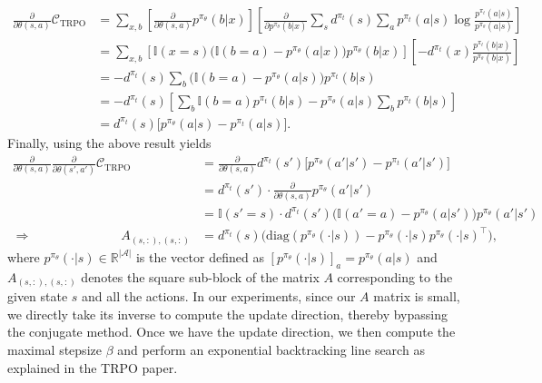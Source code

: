 \documentclass[a4paper, 10pt]{article}
\begin{document}
\begin{align}
  \frac{\partial}{\partial \theta(s, a)} \mathcal{C}_{\text{TRPO}} &= \sum_{x, b} \left[ \frac{\partial}{\partial \theta(s, a)} p^{\pi_\theta}(b | x) \right] \left[ \frac{\partial}{\partial p^{\pi_\theta}(b | x)} \sum_s d^{\pi_t}(s) \sum_a p^{\pi_t}(a | s) \log \frac{p^{\pi_t}(a | s)}{p^{\pi_\theta}(a | s)} \right] \nonumber \\
  &= \sum_{x, b} \left[ \mathbb{I}(x = s) \Big( \mathbb{I}(b = a) - p^{\pi_\theta}(a | x) \Big) p^{\pi_\theta}(b | x) \right] \left[ - d^{\pi_t}(x) \frac{p^{\pi_t}(b | x)}{p^{\pi_\theta}(b | x)} \right] \nonumber \\
  &= - d^{\pi_t}(s) \sum_b \Big( \mathbb{I}(b = a) - p^{\pi_\theta}(a | s) \Big) p^{\pi_t}(b | s) \nonumber \\
  &= - d^{\pi_t}(s) \left[ \sum_b \mathbb{I}(b = a) p^{\pi_t}(b | s) - p^{\pi_\theta}(a | s) \sum_b p^{\pi_t}(b | s) \right] \nonumber \\
  &= d^{\pi_t}(s) \Big[ p^{\pi_\theta}(a | s) - p^{\pi_t}(a | s) \Big]. \label{eq: trpo_kl_mid}
\end{align}
Finally, using the above result yields
\begin{align}
  \frac{\partial}{\partial \theta(s, a)} \frac{\partial}{\partial \theta(s', a')} \mathcal{C}_{\text{TRPO}} &= \frac{\partial}{\partial \theta(s, a)} d^{\pi_t}(s') \Big[ p^{\pi_\theta}(a' | s') - p^{\pi_t}(a' | s') \Big] \nonumber \\
  &= d^{\pi_t}(s') \cdot \frac{\partial}{\partial \theta(s, a)} p^{\pi_\theta}(a' | s') \nonumber \\
  &= \mathbb{I}(s'=s) \cdot d^{\pi_t}(s') \Big( \mathbb{I}(a'=a) - p^{\pi_\theta}(a | s') \Big) p^{\pi_\theta}(a' | s') \\
  \Rightarrow \qquad \qquad \qquad \quad A_{(s, :), (s, :)} &= d^{\pi_t}(s) \Big( \text{diag} (p^{\pi_\theta}(\cdot | s)) - p^{\pi_\theta}(\cdot | s) p^{\pi_\theta}(\cdot | s)^\top \Big),
\end{align}
where $p^{\pi_\theta}(\cdot | s) \in \mathbb{R}^{|\mathcal{A}|}$ is the vector defined as $[p^{\pi_\theta}(\cdot | s)]_a = p^{\pi_\theta}(a | s)$ and $A_{(s, :), (s, :)}$ denotes the square sub-block of the matrix $A$ corresponding to the given state $s$ and all the actions. In our experiments, since our $A$ matrix is small, we directly take its inverse to compute the update direction, thereby bypassing the conjugate method. Once we have the update direction, we then compute the maximal stepsize $\beta$ and perform an exponential backtracking line search as explained in the TRPO paper.
\end{document}
